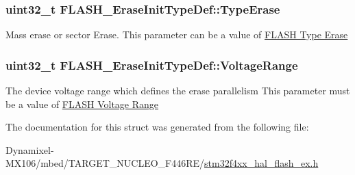 \subsubsection[{\texorpdfstring{Type\+Erase}{TypeErase}}]{\setlength{\rightskip}{0pt plus 5cm}uint32\+\_\+t F\+L\+A\+S\+H\+\_\+\+Erase\+Init\+Type\+Def\+::\+Type\+Erase}\hypertarget{struct_f_l_a_s_h___erase_init_type_def_a5d08471046a663db76d2252848a7d66c}{}\label{struct_f_l_a_s_h___erase_init_type_def_a5d08471046a663db76d2252848a7d66c}
Mass erase or sector Erase. This parameter can be a value of \hyperlink{group___f_l_a_s_h_ex___type___erase}{F\+L\+A\+SH Type Erase} 
\subsubsection[{\texorpdfstring{Voltage\+Range}{VoltageRange}}]{\setlength{\rightskip}{0pt plus 5cm}uint32\+\_\+t F\+L\+A\+S\+H\+\_\+\+Erase\+Init\+Type\+Def\+::\+Voltage\+Range}\hypertarget{struct_f_l_a_s_h___erase_init_type_def_a3a2a0c2c4ed573bb84c768c6dbb92cc9}{}\label{struct_f_l_a_s_h___erase_init_type_def_a3a2a0c2c4ed573bb84c768c6dbb92cc9}
The device voltage range which defines the erase parallelism This parameter must be a value of \hyperlink{group___f_l_a_s_h_ex___voltage___range}{F\+L\+A\+SH Voltage Range} 

The documentation for this struct was generated from the following file\+:\begin{DoxyCompactItemize}
\item 
Dynamixel-\/\+M\+X106/mbed/\+T\+A\+R\+G\+E\+T\+\_\+\+N\+U\+C\+L\+E\+O\+\_\+\+F446\+R\+E/\hyperlink{stm32f4xx__hal__flash__ex_8h}{stm32f4xx\+\_\+hal\+\_\+flash\+\_\+ex.\+h}\end{DoxyCompactItemize}
